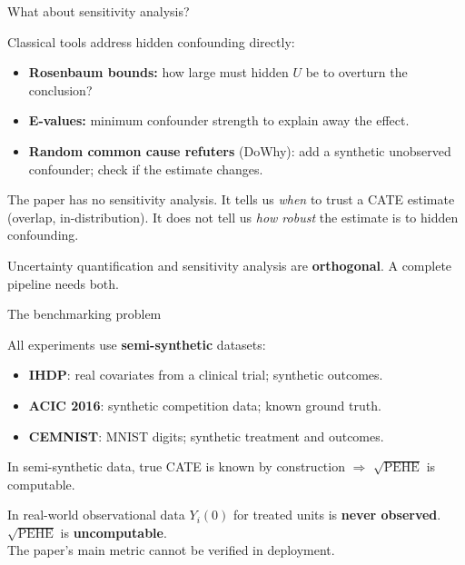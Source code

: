 \documentclass[aspectratio=169]{beamer}
\begin{document}
\begin{frame}{What about sensitivity analysis?}

Classical tools address hidden confounding directly:

\begin{itemize}
  \item \textbf{Rosenbaum bounds:} how large must hidden $U$ be to
        overturn the conclusion?
  \item \textbf{E-values:} minimum confounder strength to explain away the effect.
  \item \textbf{Random common cause refuters} (DoWhy): add a synthetic
        unobserved confounder; check if the estimate changes.
\end{itemize}

\bigskip
\begin{alertblock}{The paper has no sensitivity analysis.}
It tells us \emph{when} to trust a CATE estimate (overlap, in-distribution).
It does not tell us \emph{how robust} the estimate is to hidden confounding.
\end{alertblock}

\bigskip
Uncertainty quantification and sensitivity analysis are \textbf{orthogonal}.
A complete pipeline needs both.
\end{frame}

\begin{frame}{The benchmarking problem}

All experiments use \textbf{semi-synthetic} datasets:

\begin{itemize}
  \item \textbf{IHDP}: real covariates from a clinical trial; synthetic outcomes.
  \item \textbf{ACIC 2016}: synthetic competition data; known ground truth.
  \item \textbf{CEMNIST}: MNIST digits; synthetic treatment and outcomes.
\end{itemize}

\bigskip
In semi-synthetic data, true CATE is known by construction
$\Rightarrow$ $\sqrt{\mathrm{PEHE}}$ is computable.

\bigskip
\begin{alertblock}{In real-world observational data}
$Y_i(0)$ for treated units is \textbf{never observed}.\\
$\sqrt{\mathrm{PEHE}}$ is \textbf{uncomputable}.\\
The paper's main metric cannot be verified in deployment.
\end{alertblock}
\end{frame}
\end{document}
